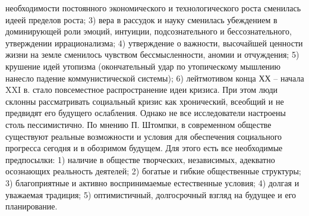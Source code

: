 \documentclass[12pt]{article}
\begin{document}
необходимости постоянного экономического и технологического роста сменилась идеей пределов роста; 3) вера
в  рассудок  и  науку  сменилась  убеждением  в  доминирующей  роли  эмоций,  интуиции,  подсознательного  и
бессознательного, утверждении иррационализма; 4) утверждение о важности, высочайшей ценности жизни на
земле  сменилось  чувством  бессмысленности,  аномии  и  отчуждения;  5)  крушение  идей  утопизма
(окончательный  удар  по  утопическому  мышлению  нанесло  падение  коммунистической  системы);  6)
лейтмотивом конца ХХ – начала XXI в. стало повсеместное распространение идеи кризиса. При этом люди
склонны  рассматривать  социальный  кризис  как  хронический,  всеобщий  и  не  предвидят  его  будущего
ослабления.
Однако  не  все  исследователи  настроены  столь  пессимистично.  По  мнению  П.  Штомпки,  в  современном
обществе существуют реальные возможности и условия для обеспечения социального прогресса сегодня и в
обозримом  будущем.  Для  этого  есть  все  необходимые  предпосылки:  1)  наличие  в  обществе  творческих,
независимых, адекватно осознающих реальность деятелей; 2) богатые и гибкие общественные структуры; 3) 
благоприятные  и  активно  воспринимаемые  естественные  условия;  4)  долгая  и  уважаемая  традиция;  5)
оптимистичный, долгосрочный взгляд на будущее и его планирование. 


\newpage
\end{document}
